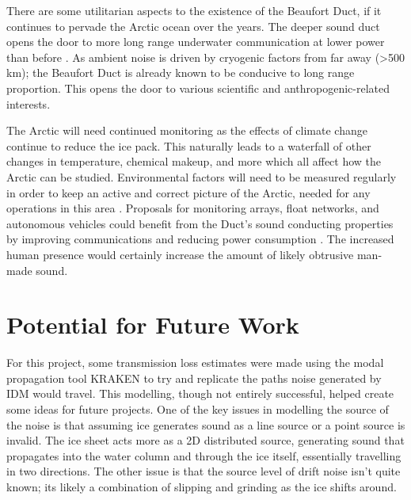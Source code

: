 There are some utilitarian aspects to the existence of the Beaufort Duct, if it continues to pervade the Arctic ocean over the years. The deeper sound duct opens the door to more long range underwater communication at lower power than before \parencite{freitag2015underwatercomms} . As ambient noise is driven by cryogenic factors from far away (>500 km); the Beaufort Duct is already known to be conducive to long range proportion. This opens the door to various scientific and anthropogenic-related interests.

The Arctic will need continued monitoring as the effects of climate change continue to reduce the ice pack. This naturally leads to a waterfall of other changes in temperature, chemical makeup, and more which all affect how the Arctic can be studied. Environmental factors will need to be measured regularly in order to keep an active and correct picture of the Arctic, needed for any operations in this area \parencite{Schmidt2016commnav} . Proposals for monitoring arrays, float networks, and autonomous vehicles could benefit from the Duct's sound conducting properties by improving communications and reducing power consumption \parencite{kukulya2016development}. The increased human presence would certainly increase the amount of likely obtrusive man-made sound.



\section{Potential for Future Work}


For this project, some transmission loss estimates were made using the modal propagation tool KRAKEN to try and replicate the paths noise generated by IDM would travel. This modelling, though not entirely successful, helped create some ideas for future projects. One of the key issues in modelling the source of the noise is that assuming ice generates sound as a line source or a point source is invalid. The ice sheet acts more as a 2D distributed source, generating sound that propagates into the water column and through the ice itself, essentially travelling in two directions. The other issue is that the source level of drift noise isn't quite known; its likely a combination of slipping and grinding as the ice shifts around.

